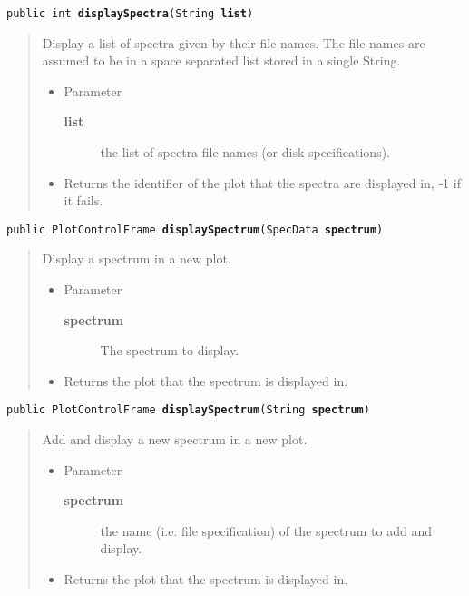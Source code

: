 \documentclass[twoside,11pt,nolof]{starlink}
\providecommand{\method}[1]{\texttt{#1}}
\newenvironment{desc}{\begin{quote}}{\end{quote}}
\begin{document}
\method{public int \textbf{displaySpectra}(\texttt{String} \textbf{list})\label{l354}\label{l355}}
\begin{desc}Display a list of spectra given by their file names. The file
 names are assumed to be in a space separated list stored in a
 single String.
\begin{itemize}
\item{Parameter
  \begin{description}
   \item[\textbf{list}]{the list of spectra file names (or disk
             specifications).}
  \end{description}}
\end{itemize}
\begin{itemize}
\item{Returns the identifier of the plot that the spectra are
         displayed in, -1 if it fails. }
\end{itemize}
\end{desc}

\method{public PlotControlFrame \textbf{displaySpectrum}(\texttt{SpecData} \textbf{spectrum})\label{l356}\label{l357}}
\begin{desc}Display a spectrum in a new plot.
\begin{itemize}
\item{Parameter
  \begin{description}
   \item[\textbf{spectrum}]{The spectrum to display.}
  \end{description}}
\end{itemize}
\begin{itemize}
\item{Returns the plot that the spectrum is displayed in. }
\end{itemize}
\end{desc}

\method{public PlotControlFrame \textbf{displaySpectrum}(\texttt{String} \textbf{spectrum})\label{l358}\label{l359}}
\begin{desc}Add and display a new spectrum in a new plot.
\begin{itemize}
\item{Parameter
  \begin{description}
   \item[\textbf{spectrum}]{the name (i.e. file specification) of the spectrum
                 to add and display.}
  \end{description}}
\end{itemize}
\begin{itemize}
\item{Returns the plot that the spectrum is displayed in. }
\end{itemize}
\end{desc}
\end{document}
